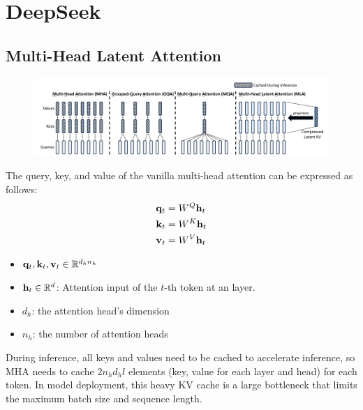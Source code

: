 \chapter{DeepSeek}

\section{Multi-Head Latent Attention}

\begin{figure}[h]
	\centering
	\includegraphics[scale=0.32]{./images/transformer/mla.png}
\end{figure}

The query, key, and value of the vanilla multi-head attention can be expressed as follows:
\begin{align*}
	{\mathbf{q}}_t &= W^{Q}{\mathbf{h}}_t\\
	{\mathbf{k}}_t &= W^{K}{\mathbf{h}}_t\\
	{\mathbf{v}}_t &= W^{V}{\mathbf{h}}_t
\end{align*}
\begin{itemize}
	\item ${\mathbf{q}}_t,{\mathbf{k}}_t,{\mathbf{v}}_t\in \mathbb{R}^{d_hn_h}$
	\item ${\mathbf{h}}_t\in \mathbb{R}^{d}$: Attention input of the $t$-th token at an layer.
	\item $d_h$: the attention head's dimension
	\item $n_h$: the number of attention heads
\end{itemize}
During inference, all keys and values need to be cached to accelerate inference, so MHA needs to cache $2n_hd_hl$ elements (\ie key, value for each layer and head) for each token. In model deployment, this heavy KV cache is a large bottleneck that limits the maximum batch size and sequence length.



